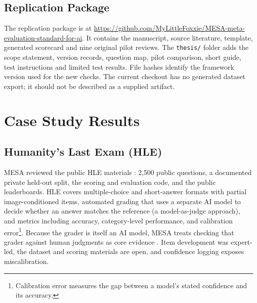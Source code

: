 \documentclass[conference]{IEEEtran}
\begin{document}
    \subsection{Replication Package}
        
        The replication package is at \url{https://github.com/MyLittleFoxxie/MESA-meta-evaluation-standard-for-ai}. It contains the manuscript, source literature, template, generated scorecard and nine original pilot reviews. The \texttt{thesis/} folder adds the scope statement, version records, question map, pilot comparison, short guide, test instructions and limited test results. File hashes identify the framework version used for the new checks. The current checkout has no generated dataset export; it should not be described as a supplied artifact.

\section{Case Study Results}

    \subsection{Humanity's Last Exam (HLE)}
    
        MESA reviewed the public HLE materials \cite{phan_etal_hle_2025}: 2,500 public questions, a documented private held-out split, the scoring and evaluation code, and the public leaderboards. HLE covers multiple-choice and short-answer formats with partial image-conditioned items, automated grading that uses a separate AI model to decide whether an answer matches the reference (a model-as-judge approach), and metrics including accuracy, category-level performance, and calibration error\footnote{Calibration error measures the gap between a model's stated confidence and its accuracy.}. Because the grader is itself an AI model, MESA treats checking that grader against human judgments as core evidence \cite{cheng_benchmarking_broken}. Item development was expert-led, the dataset and scoring materials are open, and confidence logging exposes miscalibration.
\end{document}
